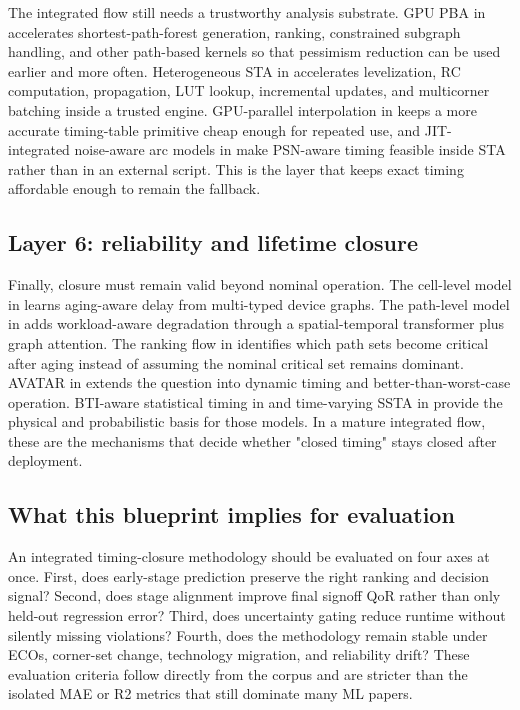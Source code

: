 \documentclass[num-refs]{wiley-article}
\begin{document}
  The integrated flow still needs a trustworthy analysis substrate. GPU PBA in \cite{ref21} accelerates shortest-path-forest generation, ranking, constrained subgraph handling, and other path-based kernels so that pessimism reduction can be used earlier and more often. Heterogeneous STA in \cite{ref22} accelerates levelization, RC computation, propagation, LUT lookup, incremental updates, and multicorner batching inside a trusted engine. GPU-parallel interpolation in \cite{ref11} keeps a more accurate timing-table primitive cheap enough for repeated use, and JIT-integrated noise-aware arc models in \cite{ref12} make PSN-aware timing feasible inside STA rather than in an external script. This is the layer that keeps exact timing affordable enough to remain the fallback.


  \subsection{Layer 6: reliability and lifetime closure}

  Finally, closure must remain valid beyond nominal operation. The cell-level model in \cite{ref14} learns aging-aware delay from multi-typed device graphs. The path-level model in \cite{ref15} adds workload-aware degradation through a spatial-temporal transformer plus graph attention. The ranking flow in \cite{ref23} identifies which path sets become critical after aging instead of assuming the nominal critical set remains dominant. AVATAR in \cite{ref26} extends the question into dynamic timing and better-than-worst-case operation. BTI-aware statistical timing in \cite{ref44} and time-varying SSTA in \cite{ref38} provide the physical and probabilistic basis for those models. In a mature integrated flow, these are the mechanisms that decide whether "closed timing" stays closed after deployment.


  \subsection{What this blueprint implies for evaluation}

  An integrated timing-closure methodology should be evaluated on four axes at once. First, does early-stage prediction preserve the right ranking and decision signal? Second, does stage alignment improve final signoff QoR rather than only held-out regression error? Third, does uncertainty gating reduce runtime without silently missing violations? Fourth, does the methodology remain stable under ECOs, corner-set change, technology migration, and reliability drift? These evaluation criteria follow directly from the corpus and are stricter than the isolated MAE or R2 metrics that still dominate many ML papers.
\end{document}
